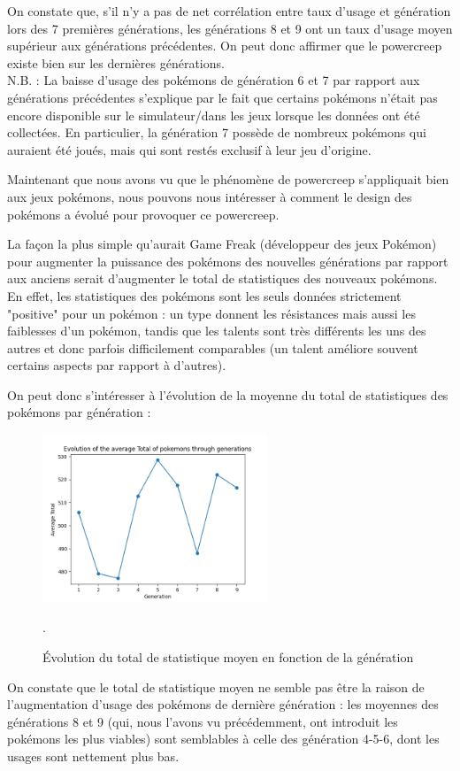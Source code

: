 \documentclass[a4paper,12pt]{article}
\begin{document}
On constate que, s'il n'y a pas de net corrélation entre taux d'usage et
génération lors des 7 premières générations, les générations 8 et 9 ont un taux
d'usage moyen supérieur aux générations précédentes. On peut donc affirmer que
le powercreep existe bien sur les dernières générations.\\
N.B. : La baisse d'usage des pokémons de génération 6 et 7 par rapport aux
générations précédentes s'explique par le fait que certains pokémons n'était pas
encore disponible sur le simulateur/dans les jeux lorsque les données ont été
collectées. En particulier, la génération 7 possède de nombreux pokémons qui
auraient été joués, mais qui sont restés exclusif à leur jeu d'origine.


Maintenant que nous avons vu que le phénomène de powercreep s'appliquait bien
aux jeux pokémons, nous pouvons nous intéresser à comment le design des pokémons
a évolué pour provoquer ce powercreep.

La façon la plus simple qu'aurait Game Freak (développeur des jeux Pokémon) pour
augmenter la puissance des pokémons des nouvelles générations par rapport aux
anciens serait d'augmenter le total de statistiques des nouveaux pokémons. En
effet, les statistiques des pokémons sont les seuls données strictement
"positive" pour un pokémon :  un type donnent les résistances mais aussi les
faiblesses d'un pokémon, tandis que les talents sont très différents les uns des
autres et donc parfois difficilement comparables (un talent améliore souvent
certains aspects par rapport à d'autres).

On peut donc s'intéresser à l'évolution de la moyenne du total de statistiques
des pokémons par génération :

\begin{figure}[htbp]
    \centering
    \includegraphics[width=0.6\textwidth]{Image/avg_total_per_generation.png}
    \caption{Évolution du total de statistique moyen en fonction de la
    génération}.
    \label{fig:image5}
\end{figure}
\newpage
On constate que le total de statistique moyen ne semble pas être la raison de
l'augmentation d'usage des pokémons de dernière génération : les moyennes des
générations 8 et 9 (qui, nous l'avons vu précédemment, ont introduit les
pokémons les plus viables) sont semblables à celle des génération 4-5-6, dont
les usages sont nettement plus bas.
\end{document}
